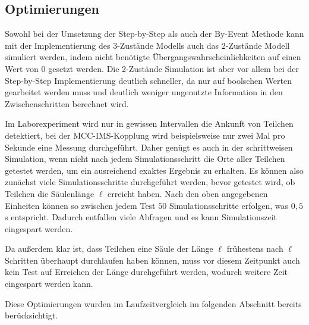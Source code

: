 % 
% 

\subsection{Optimierungen}
Sowohl bei der Umsetzung der Step-by-Step als auch der By-Event Methode kann mit der Implementierung des 3-Zustände Modells auch das 2-Zustände Modell simuliert werden, indem nicht benötigte Übergangswahrscheinlichkeiten auf einen Wert von $0$ gesetzt werden. Die 2-Zustände Simulation ist aber vor allem bei der Step-by-Step Implementierung deutlich schneller, da nur auf boolschen Werten gearbeitet werden muss und deutlich weniger ungenutzte Information in den Zwischenschritten berechnet wird.

Im Laborexperiment wird nur in gewissen Intervallen die Ankunft von Teilchen detektiert, bei der MCC-IMS-Kopplung wird beispielsweise nur zwei Mal pro Sekunde eine Messung durchgeführt. Daher genügt es auch in der schrittweisen Simulation, wenn nicht nach jedem Simulationsschritt die Orte aller Teilchen getestet werden, um ein ausreichend exaktes Ergebnis zu erhalten.
Es können also zunächst viele Simulationsschritte durchgeführt werden, bevor getestet wird, ob Teilchen die Säulenlänge $\ell$ erreicht haben. Nach den oben angegebenen Einheiten können so zwischen jedem Test $50$ Simulationsschritte erfolgen, was $0,5$ s entspricht. Dadurch entfallen viele Abfragen und es kann Simulationszeit eingespart werden. 

Da außerdem klar ist, dass Teilchen eine Säule der Länge $\ell$ frühestens nach $\ell$ Schritten überhaupt durchlaufen haben können, muss vor diesem Zeitpunkt auch kein Test auf Erreichen der Länge durchgeführt werden, wodurch weitere Zeit eingespart werden kann.

Diese Optimierungen wurden im Laufzeitvergleich im folgenden Abschnitt bereits berücksichtigt.

